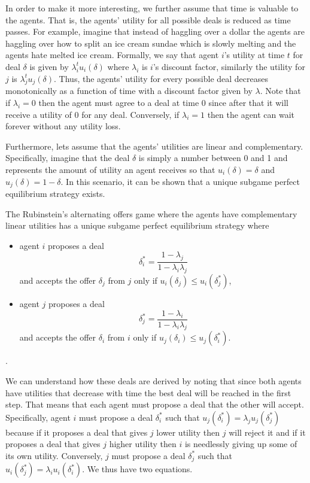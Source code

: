 In order to make it more interesting, we further assume that time is
valuable to the agents. That is, the agents' utility for all possible
deals is reduced as time passes. For example, imagine that instead of
haggling over a dollar the agents are haggling over how to split an
ice cream sundae which is slowly melting and the agents hate melted
ice cream. Formally, we say that agent $i$'s utility at time $t$ for
deal $\delta$ is given by $\lambda_i^t u_i(\delta)$ where $\lambda_i$
is $i$'s discount factor, similarly the utility for $j$ is
$\lambda_j^t u_j(\delta)$. Thus, the agents' utility for every
possible deal decreases monotonically as a function of time with a
discount factor given by $\lambda$. Note that if $\lambda_i = 0$ then
the agent must agree to a deal at time 0 since after that it will
receive a utility of 0 for any deal. Conversely, if $\lambda_i = 1$
then the agent can wait forever without any utility loss.

Furthermore, lets assume that the agents' utilities are linear and
complementary. Specifically, imagine that the deal $\delta$ is simply
a number between 0 and 1 and represents the amount of utility an agent
receives so that $u_i(\delta) = \delta$ and $u_j(\delta) = 1 -
\delta$. In this scenario, it can be shown that a unique subgame
perfect equilibrium strategy exists.

\begin{theorem}
  \label{the-rubin}
  The Rubinstein's alternating offers game where the agents have
  complementary linear utilities has a unique subgame perfect
  equilibrium strategy where 
  \begin{itemize}
  \item agent $i$ proposes a deal
    \[ \delta_i^* = \frac{1 - \lambda_j}{1 - \lambda_i\lambda_j} \]
    and accepts the offer $\delta_j$ from $j$ only if $u_i(\delta_j)
    \leq u_i(\delta_j^*)$,
  \item agent $j$ proposes a deal
    \[ \delta_j^* = \frac{1 - \lambda_i}{1 - \lambda_i\lambda_j} \]
    and accepts the offer $\delta_i$ from $i$ only if $u_j(\delta_i)
    \leq u_j(\delta_i^*)$.
  \end{itemize}
  \cite{rubinstein82a,muthoo99a}.
\end{theorem}

We can understand how these deals are derived by noting that since
both agents have utilities that decrease with time the best deal will
be reached in the first step. That means that each agent must propose
a deal that the other will accept. Specifically, agent $i$ must
propose a deal $\delta_i^*$ such that $u_j(\delta_i^*) = \lambda_j
u_j(\delta_j^*)$ because if it proposes a deal that gives $j$ lower
utility then $j$ will reject it and if it proposes a deal that gives
$j$ higher utility then $i$ is needlessly giving up some of its own
utility. Conversely, $j$ must propose a deal $\delta_j^*$ such that
$u_i(\delta_j^*) = \lambda_i u_i(\delta_i^*)$. We thus have two
equations.

